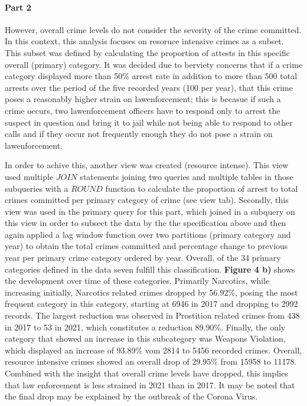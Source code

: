 \documentclass[a4paper]{article}
\begin{document}
\paragraph{Part 2} However, overall crime levels do not consider the severity of the crime committed. In this context, this analysis focuses on resoruce intensive crimes as a subset. This subset was defined by calculating the proportion of attests in this specific overall (primary) category. It was decided due to berviety concerns that if a crime category displayed more than 50\% arrest rate in addition to more than 500 total arrests over the period of the five recorded years (100 per year), that this crime poses a reasonably higher strain on lawenforcement; this is becasue if such a crime occurs, two lawenforcement officers have to respond only to arrest the suspect in question and bring it to jail while not being able to respond to other calls and if they occur not frequently enough they do not pose a strain on lawenforcement. 

In order to achive this, another view was created (resource intense). This view used multiple $JOIN$ statements joining two queries and multiple tables in those subqueries with a $ROUND$ function to calculate the proportion of arrest to total crimes committed per primary category of crime (see view tab). Secondly, this view was used in the primary query for this part, which joined in a subquery on this view in order to subsect the data by the the specification above and then again applied a lag window function over two partitions (primary category and year) to obtain the total crimes committed and percentage change to previous year per primary crime category ordered by year. Overall, of the 34 primary categories defined in the data seven fulfill this classification. \textbf{Figure 4 b)} shows the development over time of these categories. Primarily Narcotics, while increasing initially, Narcotics related crimes dropped by 56.92\%, posing the most frequent category in this category, starting at 6946 in 2017 and dropping to 2992 records. The largest reduction was observed in Prostition related crimes from 438 in 2017 to 53 in 2021, which constitutes a reduction 89.90\%. Finally, the only category that showed an increase in this subcategory was Weapons Violation, which displayed an increase of 93.89\% vom 2814 to 5456 recorded crimes. Overall, resource intensive crimes showed an overall drop of 29.95\% from 15958 to 11178. Combined with the insight that overall crime levels have dropped, this implies that law enforcement is less strained in 2021 than in 2017. It may be noted that the final drop may be explained by the outbreak of the Corona Virus.
\end{document}
